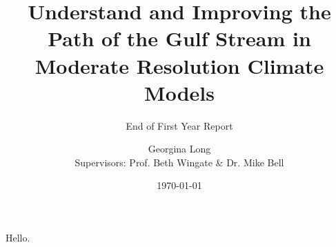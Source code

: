 \documentclass[a4paper,11pt]{article}
\title{Understand and Improving the Path of the Gulf Stream in Moderate Resolution Climate Models}
\subtitle{End of First Year Report}
\author{Georgina Long \\ Supervisors: Prof. Beth Wingate \& Dr. Mike Bell}
\date{\mydate\today}
\begin{document}
\maketitle
Hello.







%












\end{document}
